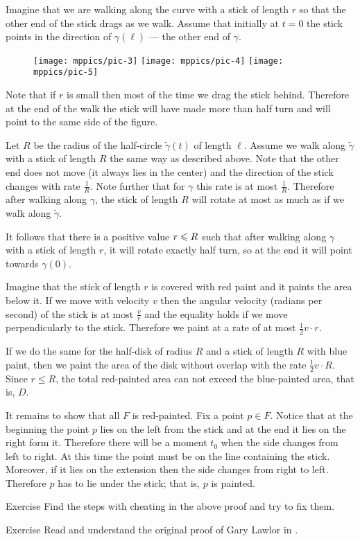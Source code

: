 Imagine that we are walking along the curve with a stick of length $r$ so that the other end of the stick drags as we walk.
Assume that initially at $t=0$ the stick points in the direction of $\gamma(\ell)$ --- the other end of $\gamma$.

\begin{wrapfigure}{r}{34 mm}
\vskip-0mm
\centering
\texttt{[image: mppics/pic-3]}
\bigskip
\texttt{[image: mppics/pic-4]}
\bigskip
\texttt{[image: mppics/pic-5]}
\end{wrapfigure}

Note that if $r$ is small then most of the time we drag the stick behind. Therefore at the end of the walk the stick will have made more than half turn and will point to the same side of the figure.

Let $R$ be the radius of the half-circle $\tilde\gamma(t)$ of length $\ell$.
Assume we walk along $\tilde\gamma$  with a stick of length $R$ the same way as described above.
Note that the other end does not move (it always lies in the center) and the direction of the stick changes with rate $\tfrac1R$.
Note further that for $\gamma$ this rate is at most $\tfrac1R$.
Therefore after walking along $\gamma$,
the stick of length $R$ will rotate at most as much as if we walk along $\tilde\gamma$.

It follows that there is a positive value $r\z\le R$ such that after walking along $\gamma$ with a stick of length $r$, it will rotate exactly half turn, so at the end it will point towards $\gamma(0)$.

Imagine that the stick of length $r$ is covered with red paint and it paints the area below it.
If we move with velocity $v$ then the angular velocity (radians per second) of the stick is at most $\tfrac vr$ and the equality holds if we move perpendicularly to the stick.
Therefore we paint at a rate of at most $\tfrac12 v\cdot r$.

If we do the same for the half-disk of radius $R$ and a stick of length $R$ with blue paint,
then we paint the area of the disk without overlap with the rate $\tfrac12 v\cdot R$.
Since $r\le R$, the total red-painted area can not exceed the blue-painted area, that is, $D$. 

It remains to show that all $F$ is red-painted.
Fix a point $p\in F$.
Notice that at the beginning the point $p$ lies on the left from the stick and at the end it lies on the right form it.
Therefore there will be a moment $t_0$ when the side changes from left to right.
At this time the point must be on the line containing the stick. 
Moreover, if it lies on the extension then the side changes from right to left. Therefore $p$ has to lie under the stick; that is, $p$ is painted.

\qeds

\begin{thm}{Exercise}
Find the steps with cheating in the above proof and try to fix them.
\end{thm}

\begin{thm}{Exercise} Read and understand the original proof of Gary Lawlor in \cite{lawlor}.
\end{thm}










